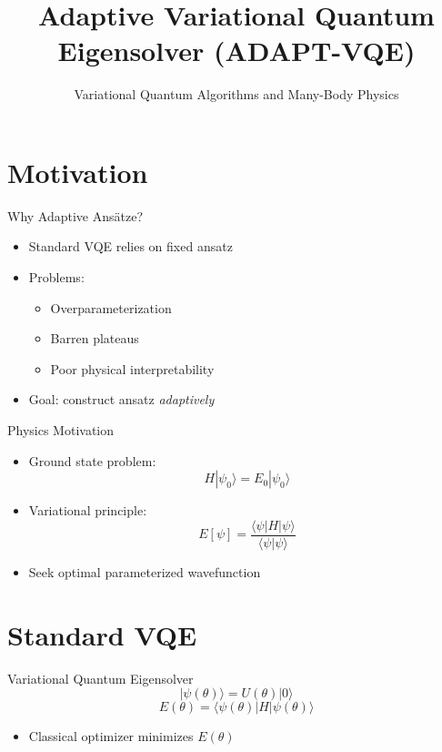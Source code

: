 \documentclass{beamer}
\title{Adaptive Variational Quantum Eigensolver (ADAPT-VQE)}
\subtitle{Variational Quantum Algorithms and Many-Body Physics}
\author{}
\date{}
\begin{document}
\frame{\titlepage}

\section{Motivation}

\begin{frame}{Why Adaptive Ansätze?}
\begin{itemize}
\item Standard VQE relies on fixed ansatz
\item Problems:
\begin{itemize}
\item Overparameterization
\item Barren plateaus
\item Poor physical interpretability
\end{itemize}
\item Goal: construct ansatz \emph{adaptively}
\end{itemize}
\end{frame}


\begin{frame}{Physics Motivation}
\begin{itemize}
\item Ground state problem:
\[
H|\psi_0\rangle = E_0 |\psi_0\rangle
\]
\item Variational principle:
\[
E[\psi] = \frac{\langle \psi|H|\psi\rangle}{\langle \psi|\psi\rangle}
\]
\item Seek optimal parameterized wavefunction
\end{itemize}
\end{frame}

\section{Standard VQE}

\begin{frame}{Variational Quantum Eigensolver}
\[
|\psi(\theta)\rangle = U(\theta)|0\rangle
\]
\[
E(\theta) = \langle \psi(\theta)|H|\psi(\theta)\rangle
\]
\begin{itemize}
\item Classical optimizer minimizes $E(\theta)$
\end{itemize}
\end{frame}
\end{document}

